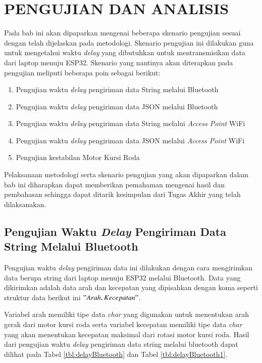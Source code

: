   \chapter{PENGUJIAN DAN ANALISIS}
\label{chap:pengujiananalisis}


Pada bab ini akan dipaparkan mengenai beberapa skenario pengujian sesuai dengan telah dijelaskan pada metodologi. Skenario pengujian ini dilakukan guna untuk mengetahui waktu \emph{delay} yang dibutuhkan untuk mentransmisikan data dari laptop menuju ESP32. Skenario yang nantinya akan diterapkan pada pengujian meliputi beberapa poin sebagai berikut:

\begin{enumerate}[nosep]
  \item Pengujian waktu \emph{delay} pengiriman data String melalui Bluetooth
  \item Pengujian waktu \emph{delay} pengiriman data JSON melalui Bluetooth
  \item Pengujian waktu \emph{delay} pengiriman data String melalui \emph{Access Point} WiFi
  \item Pengujian waktu \emph{delay} pengiriman data JSON melalui \emph{Access Point} WiFi
  \item Pengujian kestabilan Motor Kursi Roda
\end{enumerate}

Pelaksanaan metodologi serta skenario pengujian yang akan dipaparkan dalam bab ini diharapkan dapat memberikan pemahaman mengenai hasil dan pembahasan sehingga dapat ditarik kesimpulan dari Tugas Akhir yang telah dilaksanakan.


\section{Pengujian Waktu \emph{Delay} Pengiriman Data String Melalui Bluetooth}
\label{sec:delayBluetooth}

Pengujian waktu \emph{delay} pengiriman data ini dilakukan dengan cara mengirimkan data berupa string dari laptop menuju ESP32 melalui Bluetooth. Data yang dikirimkan adalah data arah dan kecepatan yang dipisahkan dengan koma seperti struktur data berikut ini \("Arah,Kecepatan"\).

Variabel arah memiliki tipe data \emph{char} yang digunakan untuk menentukan arah gerak dari motor kursi roda serta variabel kecepatan memiliki tipe data \emph{char} yang akan menentukan kecepatan maksimal dari rotasi motor kursi roda. Hasil dari pengujian waktu \emph{delay} pengiriman data string melalui bluetooth dapat dilihat pada Tabel \ref{tbl:delayBluetooth} dan Tabel \ref{tbl:delayBluetooth1}.

